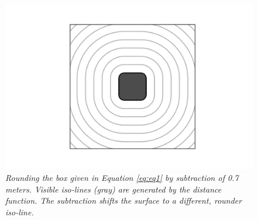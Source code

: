 \documentclass[twoside,a4paper]{article}
\begin{document}
\begin{figure}[ht]
\centerline{\includegraphics[scale=0.6]{img/sdf2dbox.png}}
\caption{\label{sdf_2d_box}{\it Rounding the box given in Equation \ref{eq:eq1} by subtraction of 0.7 meters. Visible iso-lines (gray) are generated by the distance function. The subtraction shifts the surface to a different, rounder iso-line.}}
\end{figure}  
\end{document}
